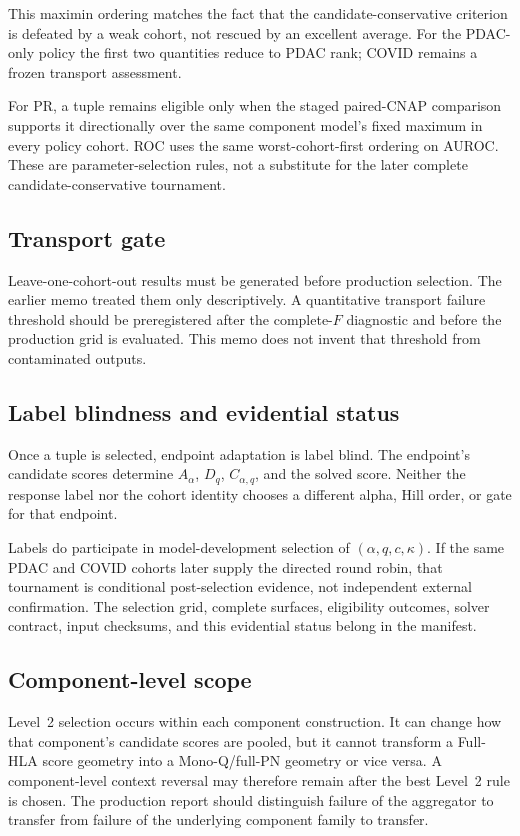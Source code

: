 \documentclass[11pt]{article}
\begin{document}
This maximin ordering matches the fact that the candidate-conservative
criterion is defeated by a weak cohort, not rescued by an excellent average.
For the PDAC-only policy the first two quantities reduce to PDAC rank; COVID
remains a frozen transport assessment.

For PR, a tuple remains eligible only when the staged paired-CNAP comparison
supports it directionally over the same component model's fixed maximum in
every policy cohort. ROC uses the same worst-cohort-first ordering on AUROC.
These are parameter-selection rules, not a substitute for the later complete
candidate-conservative tournament.

\subsection{Transport gate}

Leave-one-cohort-out results must be generated before production selection.
The earlier memo treated them only descriptively. A quantitative transport
failure threshold should be preregistered after the complete-$F$ diagnostic
and before the production grid is evaluated. This memo does not invent that
threshold from contaminated outputs.

\subsection{Label blindness and evidential status}

Once a tuple is selected, endpoint adaptation is label blind. The endpoint's
candidate scores determine $A_\alpha$, $D_q$, $C_{\alpha,q}$, and the solved
score. Neither the response label nor the cohort identity chooses a different
alpha, Hill order, or gate for that endpoint.

Labels do participate in model-development selection of
$(\alpha,q,c,\kappa)$. If the same PDAC and COVID cohorts later supply the
directed round robin, that tournament is conditional post-selection evidence,
not independent external confirmation. The selection grid, complete surfaces,
eligibility outcomes, solver contract, input checksums, and this evidential
status belong in the manifest.

\subsection{Component-level scope}

Level~2 selection occurs within each component construction. It can change how
that component's candidate scores are pooled, but it cannot transform a
Full-HLA score geometry into a Mono-Q/full-PN geometry or vice versa. A
component-level context reversal may therefore remain after the best Level~2
rule is chosen. The production report should distinguish failure of the
aggregator to transfer from failure of the underlying component family to
transfer.
\end{document}
